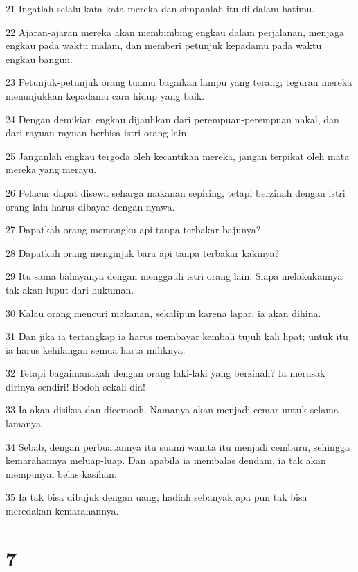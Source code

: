 \par 21 Ingatlah selalu kata-kata mereka dan simpanlah itu di dalam hatimu.
\par 22 Ajaran-ajaran mereka akan membimbing engkau dalam perjalanan, menjaga engkau pada waktu malam, dan memberi petunjuk kepadamu pada waktu engkau bangun.
\par 23 Petunjuk-petunjuk orang tuamu bagaikan lampu yang terang; teguran mereka menunjukkan kepadamu cara hidup yang baik.
\par 24 Dengan demikian engkau dijauhkan dari perempuan-perempuan nakal, dan dari rayuan-rayuan berbisa istri orang lain.
\par 25 Janganlah engkau tergoda oleh kecantikan mereka, jangan terpikat oleh mata mereka yang merayu.
\par 26 Pelacur dapat disewa seharga makanan sepiring, tetapi berzinah dengan istri orang lain harus dibayar dengan nyawa.
\par 27 Dapatkah orang memangku api tanpa terbakar bajunya?
\par 28 Dapatkah orang menginjak bara api tanpa terbakar kakinya?
\par 29 Itu sama bahayanya dengan menggauli istri orang lain. Siapa melakukannya tak akan luput dari hukuman.
\par 30 Kalau orang mencuri makanan, sekalipun karena lapar, ia akan dihina.
\par 31 Dan jika ia tertangkap ia harus membayar kembali tujuh kali lipat; untuk itu ia harus kehilangan semua harta miliknya.
\par 32 Tetapi bagaimanakah dengan orang laki-laki yang berzinah? Ia merusak dirinya sendiri! Bodoh sekali dia!
\par 33 Ia akan disiksa dan dicemooh. Namanya akan menjadi cemar untuk selama-lamanya.
\par 34 Sebab, dengan perbuatannya itu suami wanita itu menjadi cemburu, sehingga kemarahannya meluap-luap. Dan apabila ia membalas dendam, ia tak akan mempunyai belas kasihan.
\par 35 Ia tak bisa dibujuk dengan uang; hadiah sebanyak apa pun tak bisa meredakan kemarahannya.

\chapter{7}

